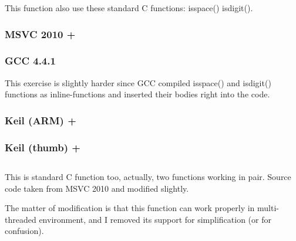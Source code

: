 {This function also use these standard C functions:} isspace() \AndENRU isdigit().

\subsubsection{MSVC 2010 + \Ox}



\subsubsection{GCC 4.4.1}

{This exercise is slightly harder since GCC compiled isspace() and isdigit()
functions as inline-functions and inserted their bodies right into the code.}



\subsubsection{Keil (ARM) + \Othree}



\subsubsection{Keil (thumb) + \Othree}



\subsection{}

{This is standard C function too, actually, two functions working in pair.
Source code taken from MSVC 2010 and modified slightly.}

{The matter of modification is that this function can work properly in multi-threaded environment,
and I removed its support for simplification (or for confusion).}

